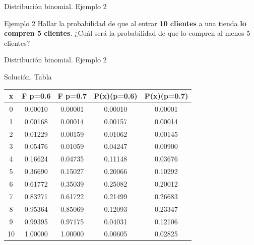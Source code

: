\documentclass[11pt]{beamer}
\begin{document}
          \begin{frame}{Distribución binomial. Ejemplo 2}
              \begin{block}{Ejemplo 2}
                   Hallar la probabilidad de que al entrar \textbf{10 clientes} a una tienda \textbf{lo compren 5 clientes}. ¿Cuál será la probabilidad de que lo compren al menos 5 clientes? \\
              \end{block}

          \end{frame}
          \begin{frame}{Distribución binomial. Ejemplo 2}

              \begin{block}{Solución. Tabla}
                  \begin{center}
                      \begin{tabular}{|c|c|c|c|c|}
                      \hline
                      x &F p=0.6  &F p=0.7  &P(x)(p=0.6) &P(x)(p=0.7)   \\
                      \hline
                      0 & 0.00010 & 0.00001 & 0.00010 & 0.00001  \\
                      1 & 0.00168 & 0.00014 & 0.00157 & 0.00014  \\
                      2 & 0.01229 & 0.00159 & 0.01062 & 0.00145  \\
                      3 & 0.05476 & 0.01059 & 0.04247 & 0.00900  \\
                      4 & 0.16624 & 0.04735 & 0.11148 & 0.03676  \\
                      5 & 0.36690 & 0.15027 & 0.20066 & 0.10292  \\
                      6 & 0.61772 & 0.35039 & 0.25082 & 0.20012  \\
                      7 & 0.83271 & 0.61722 & 0.21499 & 0.26683  \\
                      8 & 0.95364 & 0.85069 & 0.12093 & 0.23347  \\
                      9 & 0.99395 & 0.97175 & 0.04031 & 0.12106  \\
                      10 & 1.00000 & 1.00000 & 0.00605 & 0.02825  \\
                      \hline
                  \end{tabular}
                  \end{center}
              \end{block}
          \end{frame}
\end{document}
